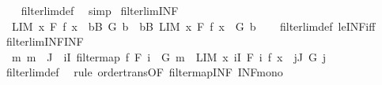 \begin{isabellebody}
%
\isadelimproof
\ \ %
\endisadelimproof
%
\isatagproof
{}\isamarkupfalse%
\ filterlim{\isacharunderscore}{\kern0pt}def\ \isamarkupfalse%
\ simp%
\endisatagproof
{\isafoldproof}%
%
\isadelimproof
\isanewline
%
\endisadelimproof
\isanewline
{}\isamarkupfalse%
\ filterlim{\isacharunderscore}{\kern0pt}INF{\isacharcolon}{\kern0pt}\isanewline
\ \ {\isachardoublequoteopen}{\isacharparenleft}{\kern0pt}LIM\ x\ F{\isachardot}{\kern0pt}\ f\ x\ {\isacharcolon}{\kern0pt}{\isachargreater}{\kern0pt}\ {\isacharparenleft}{\kern0pt}{\isasymSqinter}b{\isasymin}B{\isachardot}{\kern0pt}\ G\ b{\isacharparenright}{\kern0pt}{\isacharparenright}{\kern0pt}\ {\isasymlongleftrightarrow}\ {\isacharparenleft}{\kern0pt}{\isasymforall}b{\isasymin}B{\isachardot}{\kern0pt}\ LIM\ x\ F{\isachardot}{\kern0pt}\ f\ x\ {\isacharcolon}{\kern0pt}{\isachargreater}{\kern0pt}\ G\ b{\isacharparenright}{\kern0pt}{\isachardoublequoteclose}\isanewline
%
\isadelimproof
\ \ %
\endisadelimproof
%
\isatagproof
{}\isamarkupfalse%
\ filterlim{\isacharunderscore}{\kern0pt}def\ le{\isacharunderscore}{\kern0pt}INF{\isacharunderscore}{\kern0pt}iff\ \isacommand{{\isachardot}{\kern0pt}{\isachardot}{\kern0pt}}\isamarkupfalse%
%
\endisatagproof
{\isafoldproof}%
%
\isadelimproof
\isanewline
%
\endisadelimproof
\isanewline
{}\isamarkupfalse%
\ filterlim{\isacharunderscore}{\kern0pt}INF{\isacharunderscore}{\kern0pt}INF{\isacharcolon}{\kern0pt}\isanewline
\ \ {\isachardoublequoteopen}{\isacharparenleft}{\kern0pt}{\isasymAnd}m{\isachardot}{\kern0pt}\ m\ {\isasymin}\ J\ {\isasymLongrightarrow}\ {\isasymexists}i{\isasymin}I{\isachardot}{\kern0pt}\ filtermap\ f\ {\isacharparenleft}{\kern0pt}F\ i{\isacharparenright}{\kern0pt}\ {\isasymle}\ G\ m{\isacharparenright}{\kern0pt}\ {\isasymLongrightarrow}\ LIM\ x\ {\isacharparenleft}{\kern0pt}{\isasymSqinter}i{\isasymin}I{\isachardot}{\kern0pt}\ F\ i{\isacharparenright}{\kern0pt}{\isachardot}{\kern0pt}\ f\ x\ {\isacharcolon}{\kern0pt}{\isachargreater}{\kern0pt}\ {\isacharparenleft}{\kern0pt}{\isasymSqinter}j{\isasymin}J{\isachardot}{\kern0pt}\ G\ j{\isacharparenright}{\kern0pt}{\isachardoublequoteclose}\isanewline
%
\isadelimproof
\ \ %
\endisadelimproof
%
\isatagproof
{}\isamarkupfalse%
\ filterlim{\isacharunderscore}{\kern0pt}def\ \isamarkupfalse%
\ {\isacharparenleft}{\kern0pt}rule\ order{\isacharunderscore}{\kern0pt}trans{\isacharbrackleft}{\kern0pt}OF\ filtermap{\isacharunderscore}{\kern0pt}INF\ INF{\isacharunderscore}{\kern0pt}mono{\isacharbrackright}{\kern0pt}{\isacharparenright}{\kern0pt}%

\end{isabellebody}
